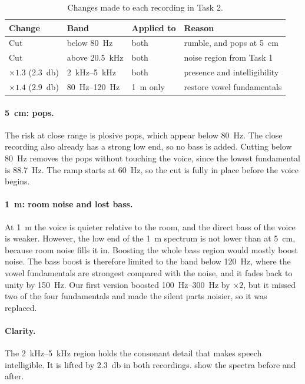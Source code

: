 \documentclass[11pt,a4paper]{article}
\begin{document}
\begin{table}[htbp]
  \centering
  \caption{Changes made to each recording in Task 2.}
  \label{tab:task2}
  \begin{tabular}{@{}llll@{}}
    \toprule
    Change & Band & Applied to & Reason \\
    \midrule
    Cut              & below \SI{80}{\hertz}          & both & rumble, and pops at \SI{5}{\centi\metre} \\
    Cut              & above \SI{20.5}{\kilo\hertz}   & both & noise region from Task 1 \\
    $\times1.3$ (\SI{+2.3}{\decibel}) & \SIrange{2}{5}{\kilo\hertz} & both & presence and intelligibility \\
    $\times1.4$ (\SI{+2.9}{\decibel}) & \SIrange{80}{120}{\hertz}   & \SI{1}{\metre} only & restore vowel fundamentals \\
    \bottomrule
  \end{tabular}
\end{table}

\paragraph{\SI{5}{\centi\metre}: pops.}
The risk at close range is plosive pops, which appear below \SI{80}{\hertz}. The close
recording also already has a strong low end, so no bass is added. Cutting
below \SI{80}{\hertz} removes the pops without touching the voice, since the
lowest fundamental is \SI{88.7}{\hertz}. The ramp starts at \SI{60}{\hertz},
so the cut is fully in place before the voice begins.

\paragraph{\SI{1}{\metre}: room noise and lost bass.}
At \SI{1}{\metre} the voice is quieter relative to the room, and the direct
bass of the voice is weaker. However, the low end of the \SI{1}{\metre}
spectrum is not lower than at \SI{5}{\centi\metre}, because room noise
fills it in. Boosting the whole bass region would mostly boost noise. The bass boost is therefore limited to the band below
\SI{120}{\hertz}, where the vowel fundamentals are strongest compared with the
noise, and it fades back to unity by \SI{150}{\hertz}. Our first version
boosted \SIrange{100}{300}{\hertz} by $\times2$, but it missed two of the four
fundamentals and made the silent parts noisier, so it was replaced.

\paragraph{Clarity.}
The \SIrange{2}{5}{\kilo\hertz} region holds the consonant detail that makes
speech intelligible. It is lifted by \SI{2.3}{\decibel} in both recordings.
 show the spectra before and after.
\end{document}
